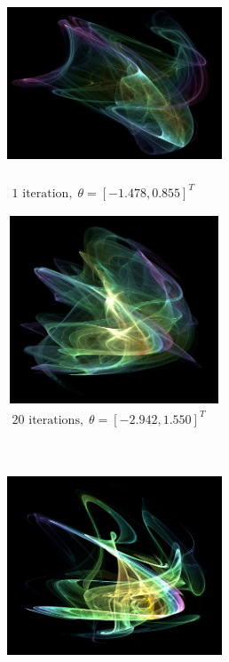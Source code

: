 \begin{figure}[t]
	\centering
	\begin{subfigure}[t]{0.48\textwidth}
		\centering
		\includegraphics[height=5.6cm,width=6.4cm]{chaos/compressed/first_iter_alt.png}
		\caption{{$\begin{array}{c}
				\text{1 iteration}, \; 
				\theta = [-1.478,0.855]^T 
				\end{array}$}}
	\end{subfigure}
	\begin{subfigure}[t]{0.48\textwidth}
		\centering
		\tiny
		\includegraphics[height=5.6cm,width=6.4cm]{chaos/compressed/20_iter_alt.png}
		\caption{{$\begin{array}{c}
				\text{20 iterations}, \; 
				\theta = [-2.942,1.550]^T 
				\end{array}$}}
	\end{subfigure}
	\\
	\vspace{20pt}
	\begin{subfigure}[t]{0.48\textwidth}
		\centering
		\tiny
		\includegraphics[height=5.6cm,width=6.4cm]{chaos/compressed/100_iter_altj.png}

\end{subfigure}
\end{figure}
